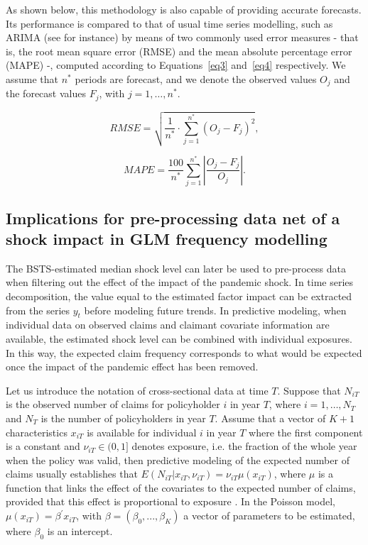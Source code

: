 \documentclass[]{risa}
\begin{document}
As shown below, this methodology is also capable of providing accurate forecasts. Its performance is compared to that of usual time series modelling, such as ARIMA (see for instance\cite{shumway_arima_2017}) by means of two commonly used error measures - that is, the root mean square error (RMSE) and the mean absolute percentage error (MAPE) -, computed according to Equations~\ref{eq3} and~\ref{eq4} respectively. We assume that $n^*$ periods are forecast, and we denote the observed values $O_j$ and the forecast values $F_j$, with $j=1,\dots, n^*$.

\begin{equation}\label{eq3}
RMSE=\sqrt{\frac{1}{n^*} \cdot \sum_{j=1}^{n^*} (O_j-F_j)^2},
\end{equation}

\begin{equation}\label{eq4}
MAPE=\frac{100}{n^*} \sum_{j=1}^{n^*} \left | \frac{O_j-F_j}{O_j} \right |.
\end{equation}

\subsection{Implications for pre-processing data net of a shock impact in GLM frequency modelling}

The BSTS-estimated median shock level can later be used to pre-process data when filtering out the effect of the impact of the pandemic shock. In time series decomposition, the value equal to the estimated factor impact can be extracted from the series $y_t$ before modeling future trends. In predictive modeling, when individual data on observed claims and claimant covariate information are available, the estimated shock level can be combined with individual exposures. In this way, the expected claim frequency corresponds to what would be expected once the impact of the pandemic effect has been removed.

Let us introduce the notation of cross-sectional data at time $T$. Suppose that $N_{iT}$ is the observed number of claims for policyholder $i$ in year $T$, where $i=1,\dots, N_T$ and $N_T$ is the number of policyholders in year $T$. Assume that a vector of $K+1$ characteristics $x_{iT}$ is available for individual $i$ in year $T$ where the first component is a constant and $\nu_{iT} \in (0,1]$ denotes exposure, i.e. the fraction of the whole year when the policy was valid, then predictive modeling of the expected number of claims usually establishes that $E(N_{iT}|x_{iT}, \nu_{iT})= \nu_{iT}\mu(x_{iT})$, where $\mu$ is a function that links the effect of the covariates to the expected number of claims, provided that this effect is proportional to exposure \cite{wuthrich2023statistical}. In the Poisson model, $\mu(x_{iT})=\beta^\prime x_{iT}$, with $\beta = (\beta_0,...,\beta_K)$ a vector of parameters to be estimated, where $\beta_0$ is an intercept.
\end{document}
